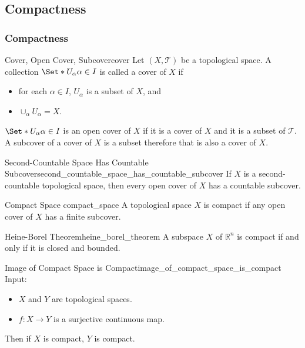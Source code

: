 \documentclass{article}
\begin{document}
\subsection{Compactness}

\subsubsection{Compactness}

\begin{definition}{Cover, Open Cover, Subcover}{cover}
    Let $(X,\mathcal{T})$ be a topological space.
    A collection $\Set*{U_\alpha}{\alpha\in I}$ is called a cover of $X$ if
    \begin{itemize}
        \item for each $\alpha\in I$, $U_\alpha$ is a subset of $X$, and
        \item $\cup_\alpha U_\alpha = X$.
    \end{itemize}
    $\Set*{U_\alpha}{\alpha\in I}$ is an open cover of $X$ if it is a cover of $X$ and it is a subset of $\mathcal{T}$.
    A subcover of a cover of $X$ is a subset therefore that is also a cover of $X$.
\end{definition}

\begin{theorem}{Second-Countable Space Has Countable Subcover}{second_countable_space_has_countable_subcover}
    If $X$ is a second-countable topological space, then every open cover of $X$ has a countable subcover.
\end{theorem}

\begin{definition}{Compact Space }{compact_space}
    A topological space $X$ is compact if any open cover of $X$ has a finite subcover.
\end{definition}

\begin{theorem}{Heine-Borel Theorem}{heine_borel_theorem}
    A subspace $X$ of $\mathbb{R}^n$ is compact if and only if it is closed and bounded.
\end{theorem}

\begin{theorem}{Image of Compact Space is Compact}{image_of_compact_space_is_compact}
    Input:
    \begin{itemize}
        \item $X$ and $Y$ are topological spaces.
        \item $f:X\rightarrow Y$ is a surjective continuous map.
    \end{itemize}
    Then if $X$ is compact, $Y$ is compact.
\end{theorem}
\end{document}
